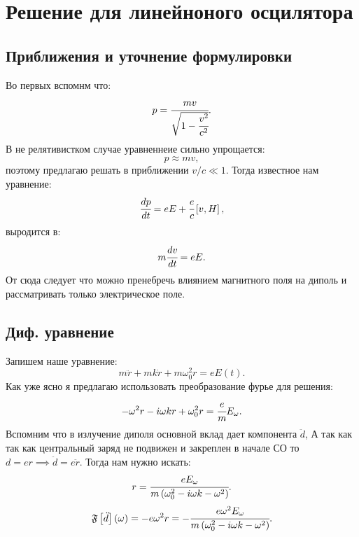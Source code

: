 \section{Решение для линейноного осцилятора}
\subsection{Приближения и уточнение формулировки}

Во первых вспомнм что:
\begin{equation}
    p  = \cfrac{mv}{\sqrt{1 - \cfrac{v^2}{c^2}}}.
\end{equation}
В не релятивистком случае уравненнеие сильно упрощается:
\begin{equation}
    p \approx mv,
\end{equation}
поэтому предлагаю решать в приближении $v/c \ll 1$.
Тогда известное нам уравнение:
\begin{equation}
    \cfrac{dp}{dt} = e  E + \cfrac{e}{c} \left[  v,  H \right],
\end{equation}
выродится в: 
\begin{equation}
    m\cfrac{dv}{dt} = e  E.
\end{equation}
От сюда следует что можно пренебречь влиянием магнитного поля на диполь и 
рассматривать только электрическое поле. 

\subsection{Диф. уравнение}
 
Запишем наше уравнение:
\begin{equation}
    m \ddot r + mk\dot r + m\omega_0^2r = e E(t).
\end{equation}
Как уже ясно я предлагаю использовать преобразование фурье для решения:
\begin{equation}
    -\omega^2 r - i\omega kr + \omega_0^2r = \cfrac{e}{m} E_\omega.
\end{equation}
Вспомним что в излучение диполя основной вклад дает компонента $\ddot d$,
А так как так как центральный заряд не подвижен и закреплен в начале СО 
то $d = e r \implies \ddot{d} = e\ddot{{r}}$. Тогда 
нам нужно искать:
\begin{equation}
    r = \cfrac{eE_\omega}{m\left( \omega_0^2 - i\omega k - \omega^2  \right)}.
\end{equation}
\begin{equation}
    \mathfrak F \left[ \ddot d \right](\omega)= -e\omega^2 r = 
    -\cfrac{e\omega^2E_\omega}{m\left( \omega_0^2 - i\omega k 
    - \omega^2  \right)}.
    \label{eq:ddot_d}
\end{equation}

